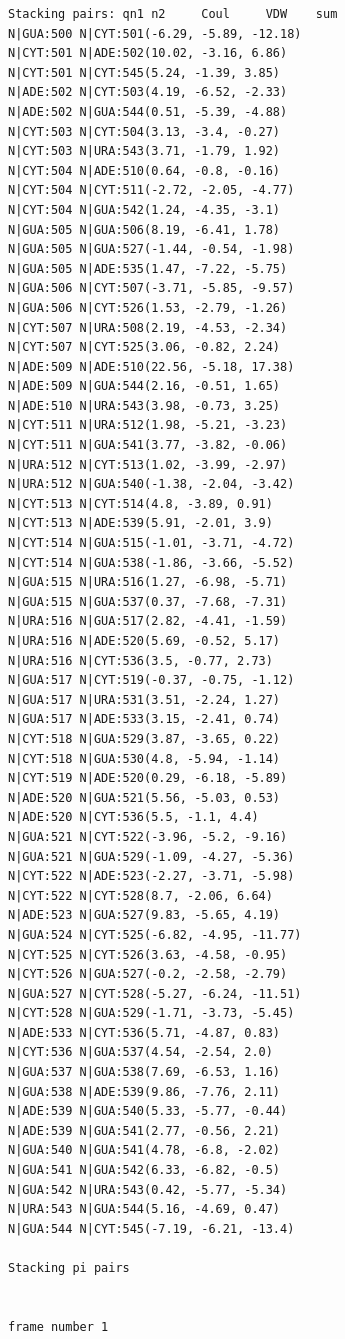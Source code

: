 \documentclass[12pt]{article}
\begin{document}
\begin{appendices}
\begin{scriptsize}
\begin{lstlisting}
Stacking pairs: qn1 n2     Coul     VDW    sum
N|GUA:500 N|CYT:501(-6.29, -5.89, -12.18)
N|CYT:501 N|ADE:502(10.02, -3.16, 6.86)
N|CYT:501 N|CYT:545(5.24, -1.39, 3.85)
N|ADE:502 N|CYT:503(4.19, -6.52, -2.33)
N|ADE:502 N|GUA:544(0.51, -5.39, -4.88)
N|CYT:503 N|CYT:504(3.13, -3.4, -0.27)
N|CYT:503 N|URA:543(3.71, -1.79, 1.92)
N|CYT:504 N|ADE:510(0.64, -0.8, -0.16)
N|CYT:504 N|CYT:511(-2.72, -2.05, -4.77)
N|CYT:504 N|GUA:542(1.24, -4.35, -3.1)
N|GUA:505 N|GUA:506(8.19, -6.41, 1.78)
N|GUA:505 N|GUA:527(-1.44, -0.54, -1.98)
N|GUA:505 N|ADE:535(1.47, -7.22, -5.75)
N|GUA:506 N|CYT:507(-3.71, -5.85, -9.57)
N|GUA:506 N|CYT:526(1.53, -2.79, -1.26)
N|CYT:507 N|URA:508(2.19, -4.53, -2.34)
N|CYT:507 N|CYT:525(3.06, -0.82, 2.24)
N|ADE:509 N|ADE:510(22.56, -5.18, 17.38)
N|ADE:509 N|GUA:544(2.16, -0.51, 1.65)
N|ADE:510 N|URA:543(3.98, -0.73, 3.25)
N|CYT:511 N|URA:512(1.98, -5.21, -3.23)
N|CYT:511 N|GUA:541(3.77, -3.82, -0.06)
N|URA:512 N|CYT:513(1.02, -3.99, -2.97)
N|URA:512 N|GUA:540(-1.38, -2.04, -3.42)
N|CYT:513 N|CYT:514(4.8, -3.89, 0.91)
N|CYT:513 N|ADE:539(5.91, -2.01, 3.9)
N|CYT:514 N|GUA:515(-1.01, -3.71, -4.72)
N|CYT:514 N|GUA:538(-1.86, -3.66, -5.52)
N|GUA:515 N|URA:516(1.27, -6.98, -5.71)
N|GUA:515 N|GUA:537(0.37, -7.68, -7.31)
N|URA:516 N|GUA:517(2.82, -4.41, -1.59)
N|URA:516 N|ADE:520(5.69, -0.52, 5.17)
N|URA:516 N|CYT:536(3.5, -0.77, 2.73)
N|GUA:517 N|CYT:519(-0.37, -0.75, -1.12)
N|GUA:517 N|URA:531(3.51, -2.24, 1.27)
N|GUA:517 N|ADE:533(3.15, -2.41, 0.74)
N|CYT:518 N|GUA:529(3.87, -3.65, 0.22)
N|CYT:518 N|GUA:530(4.8, -5.94, -1.14)
N|CYT:519 N|ADE:520(0.29, -6.18, -5.89)
N|ADE:520 N|GUA:521(5.56, -5.03, 0.53)
N|ADE:520 N|CYT:536(5.5, -1.1, 4.4)
N|GUA:521 N|CYT:522(-3.96, -5.2, -9.16)
N|GUA:521 N|GUA:529(-1.09, -4.27, -5.36)
N|CYT:522 N|ADE:523(-2.27, -3.71, -5.98)
N|CYT:522 N|CYT:528(8.7, -2.06, 6.64)
N|ADE:523 N|GUA:527(9.83, -5.65, 4.19)
N|GUA:524 N|CYT:525(-6.82, -4.95, -11.77)
N|CYT:525 N|CYT:526(3.63, -4.58, -0.95)
N|CYT:526 N|GUA:527(-0.2, -2.58, -2.79)
N|GUA:527 N|CYT:528(-5.27, -6.24, -11.51)
N|CYT:528 N|GUA:529(-1.71, -3.73, -5.45)
N|ADE:533 N|CYT:536(5.71, -4.87, 0.83)
N|CYT:536 N|GUA:537(4.54, -2.54, 2.0)
N|GUA:537 N|GUA:538(7.69, -6.53, 1.16)
N|GUA:538 N|ADE:539(9.86, -7.76, 2.11)
N|ADE:539 N|GUA:540(5.33, -5.77, -0.44)
N|ADE:539 N|GUA:541(2.77, -0.56, 2.21)
N|GUA:540 N|GUA:541(4.78, -6.8, -2.02)
N|GUA:541 N|GUA:542(6.33, -6.82, -0.5)
N|GUA:542 N|URA:543(0.42, -5.77, -5.34)
N|URA:543 N|GUA:544(5.16, -4.69, 0.47)
N|GUA:544 N|CYT:545(-7.19, -6.21, -13.4)

Stacking pi pairs


frame number 1

\end{lstlisting}



\end{scriptsize}
\end{appendices}
\end{document}
